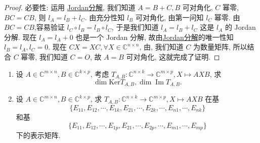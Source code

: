 \documentclass[../../main.tex]{subfiles}
\begin{document}
\begin{proof}
{\heiti 必要性: }运用 \hyperref[theorem:矩阵分解-Jordan分解]{Jordan分解}, 我们知道 $A = B + C, B$ 可对角化, $C$ 幂零, $BC = CB$, 则 $l_A = l_B + l_C$. 由充分性知 $l_B$ 可对角化, 由第一问知 $l_C$ 幂零. 由$BC=CB$,容易验证 $l_C \circ  l_B = l_B \circ  l_C$, 于是我们知道 $l_A = l_B + l_C$ 这是 $l_A$ 的 Jordan 分解. 现在 $l_A = l_A + 0$ 也是一个 Jordan 分解, 故由\hyperref[theorem:矩阵分解-Jordan分解]{Jordan分解}的唯一性知$l_B = l_A, l_C = 0$. 现在 $CX = XC, \forall X \in \mathbb{C}^{n \times n}$, 由, 我们知道 $C$ 为数量矩阵, 所以结合 $C$ 幂零, 我们知道 $C = O$, 故 $A = B$ 可对角化, 这就完成了证明.

\end{proof}

\begin{example}
\begin{enumerate}
\item 设 $A \in \mathbb{C}^{m \times n}, B \in \mathbb{C}^{k \times p}$, 考虑 $T_{A,B} : \mathbb{C}^{n \times k} \to \mathbb{C}^{m \times p}, X \mapsto AXB$, 求
$$\dim \mathrm{Ker} T_{A,B}, \dim \operatorname{Im} T_{A,B}.$$

\item 设 $A \in \mathbb{C}^{m \times n}, B \in \mathbb{C}^{k \times p}$, 求 $T_{A,B} : \mathbb{C}^{n \times k} \to \mathbb{C}^{m \times p}, X \mapsto AXB$ 在基
$$\{E_{11}, E_{12}, \cdots, E_{1k}, E_{21}, \cdots, E_{2k}, \cdots, E_{n1}, \cdots, E_{nk}\}$$
和基
$$\{E_{11}, E_{12}, \cdots, E_{1p}, E_{21}, \cdots, E_{2p}, \cdots, E_{m1}, \cdots, E_{mp}\}$$
下的表示矩阵.
\end{enumerate}
\end{example}
\end{document}
